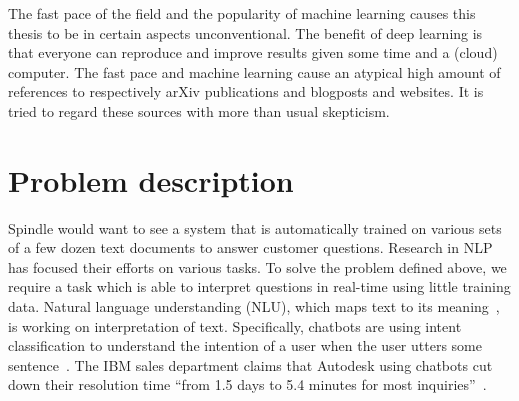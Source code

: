 The fast pace of the field and the popularity of machine learning causes this thesis to be in certain aspects unconventional.
The benefit of deep learning is that everyone can reproduce and improve results given some time and a (cloud) computer.
The fast pace and machine learning cause an atypical high amount of references to respectively arXiv publications and blogposts and websites.
It is tried to regard these sources with more than usual skepticism.

\section{Problem description}
\label{sec:problem_description}
Spindle would want to see a system that is automatically trained on various sets of a few dozen text documents to answer customer questions.
Research in NLP has focused their efforts on various tasks.
To solve the problem defined above, we require a task which is able to interpret questions in real-time using little training data.
Natural language understanding (NLU), which maps text to its meaning~\citep{jurafsky2014speech}, is working on interpretation of text.
Specifically, chatbots are using intent classification to understand the intention of a user when the user utters some sentence~\citep{bocklisch2017rasa,burtsev2018,zhou2018design}.
The IBM sales department claims that Autodesk using chatbots cut down their resolution time ``from 1.5 days to 5.4 minutes for most inquiries''~\citep{ibm2018autodesk}.

